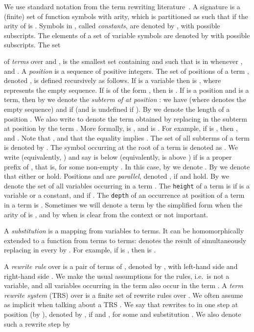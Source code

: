 \documentclass{LMCS}
\theoremstyle{plain}
\begin{document}
\noindent We use standard notation from the
term rewriting literature~\cite{Allthat}.
A signature  is a (finite) set of function
symbols with arity, which is partitioned as 
such that  if the arity of  is .
Symbols in ,
called {\em constants},
are denoted by , with possible subscripts.
The elements of a set  of 
variable symbols are denoted by  with possible subscripts. 
The set

of {\em terms} over  and ,
is the smallest set containing  and
such that  is in 
whenever ,
and . A
{\it position\/} is a sequence of positive integers.
The set of positions of a term , denoted ,
is defined recursively as follows. If  is a variable
then  is , where 
represents the empty sequence. If  is of the
form , then  is
.
If  is a
position and  is a term, then by  we denote the {\em subterm
of  at position \/}: we have  (where 
denotes the empty sequence) and  if
 (and is undefined if ).
By  we denote the length of a position .
We also write 
to denote the term obtained by replacing in  the subterm at
position  by the term .
More formally,  is , and
 is
.
For example, if  is
, then , and .
Note that , and that the equality 
implies .
The set of all subterms of a term  is
denoted by .
The symbol occurring at the root of a term 
is denoted as .
We write  (equivalently, )
and say  is below 
(equivalently,  is above ) if  is a proper
prefix of , that is,  for some non-empty .
In this case, by  we denote .
By  we denote that either  or  hold.
Positions  and  are {\em parallel}, denoted ,
if  and
 hold.
By  we denote the set of all variables occurring in a term .
The {\tt height} of a term  is  if  is a variable or a constant,
and  if .
The {\tt depth} of an occurrence at position  of a term  in
a term  is .
Sometimes we will denote a term  by
the simplified form  when the arity of  is , and  by
 when  is clear from the context or not important.

A {\it substitution\/}  is a mapping from variables to terms.
It can be homomorphically extended to a function from
terms to terms:
 denotes the result of
simultaneously replacing in  every  by .
For example, if  is
, then
 is .

A \emph{rewrite rule} over 
is a pair of terms  of , denoted
by , with left-hand side  and right-hand side .
We make the usual assumptions for the rules, i.e.\  is not a variable,
and all variables occurring in the term  also occur in the term .
A \emph{term rewrite system} (TRS)  over  is a finite set of
rewrite rules over . We often assume  as implicit
when talking about a TRS .
We say that  rewrites to  in one step at position  (by ),
denoted by , if
 and , for some 
and substitution .
We also denote such a rewrite step by
\end{document}
